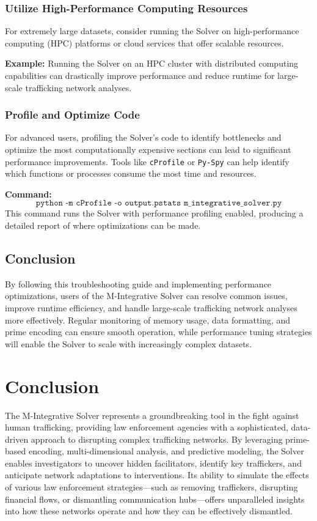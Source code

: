 \documentclass[%
 preprint, linenumbers,
 amsmath,amssymb,
 aps, physrev,
]{revtex4-2}
\begin{document}
\subsubsection{Utilize High-Performance Computing Resources}

For extremely large datasets, consider running the Solver on high-performance computing (HPC) platforms or cloud services that offer scalable resources.

\textbf{Example:} Running the Solver on an HPC cluster with distributed computing capabilities can drastically improve performance and reduce runtime for large-scale trafficking network analyses.

\subsubsection{Profile and Optimize Code}

For advanced users, profiling the Solver’s code to identify bottlenecks and optimize the most computationally expensive sections can lead to significant performance improvements. Tools like \texttt{cProfile} or \texttt{Py-Spy} can help identify which functions or processes consume the most time and resources.

\textbf{Command:}
\[
\texttt{python -m cProfile -o output.pstats m\_integrative\_solver.py}
\]
This command runs the Solver with performance profiling enabled, producing a detailed report of where optimizations can be made.

\subsection{Conclusion}

By following this troubleshooting guide and implementing performance optimizations, users of the M-Integrative Solver can resolve common issues, improve runtime efficiency, and handle large-scale trafficking network analyses more effectively. Regular monitoring of memory usage, data formatting, and prime encoding can ensure smooth operation, while performance tuning strategies will enable the Solver to scale with increasingly complex datasets.

\section{Conclusion}

The M-Integrative Solver represents a groundbreaking tool in the fight against human trafficking, providing law enforcement agencies with a sophisticated, data-driven approach to disrupting complex trafficking networks. By leveraging prime-based encoding, multi-dimensional analysis, and predictive modeling, the Solver enables investigators to uncover hidden facilitators, identify key traffickers, and anticipate network adaptations to interventions. Its ability to simulate the effects of various law enforcement strategies—such as removing traffickers, disrupting financial flows, or dismantling communication hubs—offers unparalleled insights into how these networks operate and how they can be effectively dismantled.
\end{document}
